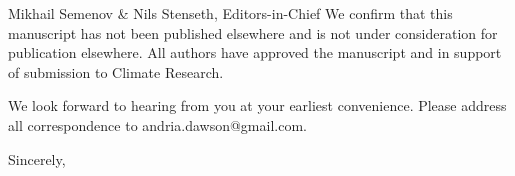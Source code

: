 \documentclass[11pt]{letter} %
\begin{document}
\begin{letter}{Mikhail Semenov \& Nils Stenseth, Editors-in-Chief}
We confirm that this manuscript has not been published elsewhere and is not under consideration for publication elsewhere. All authors have approved the manuscript and in support of submission to Climate Research.

We look forward to hearing from you at your earliest convenience. Please address all correspondence to andria.dawson@gmail.com.

\closing{Sincerely,}




\end{letter}
\end{document}
